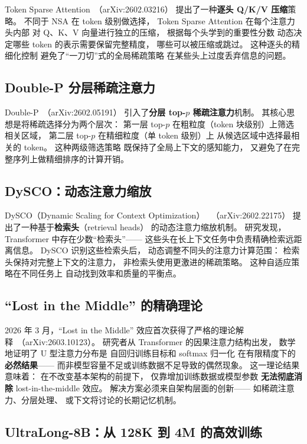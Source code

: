 Token Sparse Attention~\cite{tokensparse2026}（arXiv:2602.03216）
提出了一种\textbf{逐头 Q/K/V 压缩}策略。
不同于 NSA 在 token 级别做选择，
Token Sparse Attention 在每个注意力头内部
对 Q、K、V 向量进行独立的压缩，
根据每个头学到的重要性分数
动态决定哪些 token 的表示需要保留完整精度，
哪些可以被压缩或跳过。
这种逐头的精细化控制
避免了``一刀切''式的全局稀疏策略
在某些头上过度丢弃信息的问题。

\subsection{Double-P 分层稀疏注意力}

Double-P~\cite{doublep2026}（arXiv:2602.05191）
引入了\textbf{分层 top-$p$ 稀疏注意力}机制。
其核心思想是将稀疏选择分为两个层次：
第一层 top-$p$ 在粗粒度（token 块级别）上筛选相关区域，
第二层 top-$p$ 在精细粒度（单 token 级别）上
从候选区域中选择最相关的 token。
这种两级筛选策略
既保持了全局上下文的感知能力，
又避免了在完整序列上做精细排序的计算开销。

\subsection{DySCO：动态注意力缩放}

DySCO（Dynamic Scaling for Context Optimization）
~\cite{dysco2026}（arXiv:2602.22175）
提出了一种基于\textbf{检索头}（retrieval heads）
的动态注意力缩放机制。
研究发现，Transformer 中存在少数``检索头''——
这些头在长上下文任务中负责精确检索远距离信息。
DySCO 识别这些检索头后，
动态调整不同头的注意力计算范围：
检索头保持对完整上下文的注意力，
非检索头使用更激进的稀疏策略。
这种自适应策略在不同任务上
自动找到效率和质量的平衡点。

\subsection{``Lost in the Middle'' 的精确理论}

2026 年 3 月，``Lost in the Middle''
效应首次获得了严格的理论解释~\cite{lostmiddle2026}（arXiv:2603.10123）。
研究者从 Transformer 的因果注意力结构出发，
数学地证明了 U 型注意力分布是
自回归训练目标和 softmax 归一化
在有限精度下的\textbf{必然结果}——
而非模型容量不足或训练数据不足导致的偶然现象。
这一理论结果意味着：
在不改变基本架构的前提下，
仅靠增加训练数据或模型参数
\textbf{无法彻底消除} lost-in-the-middle 效应。
解决方案必须来自架构层面的创新——
如稀疏注意力、分层处理、
或下文将讨论的长期记忆机制。

\subsection{UltraLong-8B：从 128K 到 4M 的高效训练}


